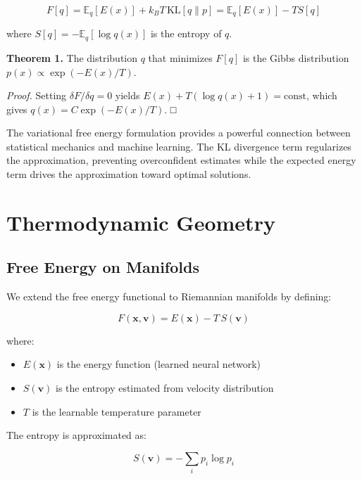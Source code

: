 \documentclass[12pt,a4paper]{article}
\begin{document}
\begin{equation}
F[q] = \mathbb{E}_q[E(x)] + k_B T \, \text{KL}[q \| p]
       = \mathbb{E}_q[E(x)] - T S[q]
\end{equation}

where $S[q] = -\mathbb{E}_q[\log q(x)]$ is the entropy of $q$.

\textbf{Theorem 1.} The distribution $q$ that minimizes $F[q]$ is the Gibbs distribution $p(x) \propto \exp(-E(x)/T)$.

\textit{Proof.} Setting $\delta F/\delta q = 0$ yields $E(x) + T(\log q(x) + 1) = \text{const}$, which gives $q(x) = C \exp(-E(x)/T)$. □

The variational free energy formulation provides a powerful connection between statistical mechanics and machine learning. The KL divergence term regularizes the approximation, preventing overconfident estimates while the expected energy term drives the approximation toward optimal solutions.

\section{Thermodynamic Geometry}

\subsection{Free Energy on Manifolds}

We extend the free energy functional to Riemannian manifolds by defining:

\begin{equation}
F(\mathbf{x}, \mathbf{v}) = E(\mathbf{x}) - T \, S(\mathbf{v})
\end{equation}

where:
\begin{itemize}[leftmargin=1.5cm]
\item $E(\mathbf{x})$ is the energy function (learned neural network)
\item $S(\mathbf{v})$ is the entropy estimated from velocity distribution
\item $T$ is the learnable temperature parameter
\end{itemize}

The entropy is approximated as:

\begin{equation}
S(\mathbf{v}) = -\sum_i p_i \log p_i
\end{equation}
\end{document}
